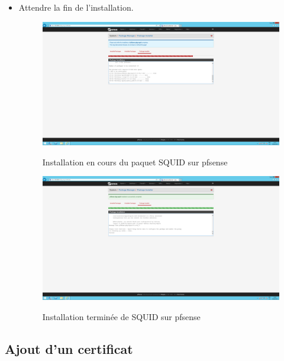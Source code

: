 \begin{itemize}
    \item Attendre la fin de l'installation.
\begin{figure}[h!]
    \begin{center}
        \includegraphics[scale=0.20]{Pfsense_Screeshots/interception/7.png}
        \label{Pfsense_Screeshots/interception/7}
        \caption{Installation en cours du paquet SQUID sur pfsense}
    \end{center}
\end{figure}
\FloatBarrier 
    

\begin{figure}[h!]
    \begin{center}
        \includegraphics[scale=0.20]{Pfsense_Screeshots/interception/8.png}
        \label{Pfsense_Screeshots/interception/8}
        \caption{Installation terminée de SQUID sur pfsense}
    \end{center}
\end{figure}
\FloatBarrier 

\end{itemize}


\subsection{Ajout d'un certificat}

